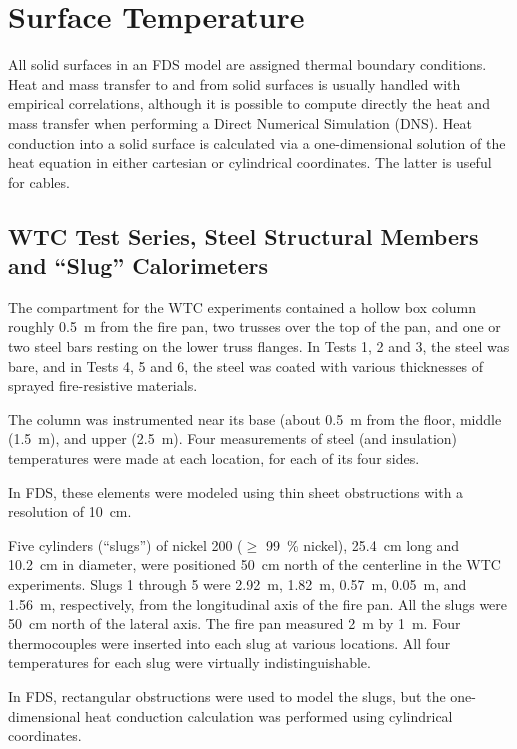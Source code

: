 \chapter{Surface Temperature}

All solid surfaces in an FDS model are assigned thermal boundary conditions.
Heat and mass transfer to and from solid surfaces is
usually handled with empirical correlations, although it is possible
to compute directly the heat and mass transfer when performing a
Direct Numerical Simulation (DNS). Heat conduction into a solid surface is calculated via a one-dimensional solution of
the heat equation in either cartesian or cylindrical coordinates. The latter is useful for cables.



\section{WTC Test Series, Steel Structural Members and ``Slug'' Calorimeters}

The compartment for the WTC experiments contained a hollow box column roughly 0.5~m from the fire pan, two trusses over the top
of the pan, and one or two steel bars resting on the lower truss flanges. In Tests 1, 2 and 3, the steel was bare, and in Tests 4, 5 and 6, the
steel was coated with various thicknesses of sprayed fire-resistive materials.

The column was instrumented near its base (about
0.5~m from the floor, middle (1.5~m), and upper (2.5~m). Four measurements of steel (and insulation) temperatures were made at each location, for
each of its four sides.

In FDS, these elements were modeled using thin sheet obstructions with a resolution of 10~cm.

Five cylinders (``slugs'') of nickel 200 ($\ge$ 99~\% nickel), 25.4~cm long and 10.2~cm in diameter, were positioned
50~cm north of the centerline in the WTC experiments. Slugs 1 through 5 were 2.92~m, 1.82~m, 0.57~m, 0.05~m, and 1.56~m, respectively, from the
longitudinal axis of the fire pan. All the slugs were 50~cm north of the lateral axis. The fire pan measured 2~m by 1~m. Four thermocouples were
inserted into each slug at various locations. All four temperatures for each slug were virtually indistinguishable.

In FDS, rectangular obstructions were used to model the slugs, but the one-dimensional heat conduction calculation was performed using
cylindrical coordinates.



